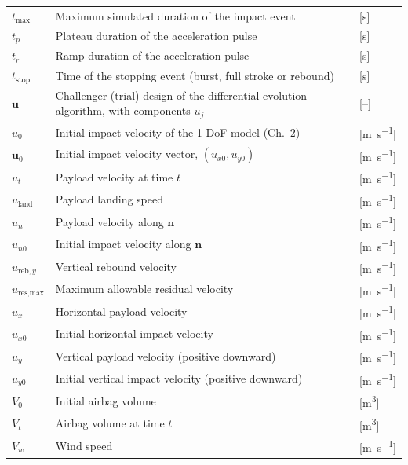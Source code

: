 {\begin{longtable}{L{0.16} L{0.64} L{0.20}}
$t_\text{max}$ & Maximum simulated duration of the impact event & [\si{\second}] \\
$t_p$ & Plateau duration of the acceleration pulse & [\si{\second}] \\
$t_r$ & Ramp duration of the acceleration pulse & [\si{\second}] \\
$t_\text{stop}$ & Time of the stopping event (burst, full stroke or rebound) & [\si{\second}] \\
$\mathbf{u}$ & Challenger (trial) design of the differential evolution algorithm, with components $u_j$ & [--] \\
$u_0$ & Initial impact velocity of the 1-DoF model (Ch.~2) & [\si{\metre\per\second}] \\
$\mathbf{u}_0$ & Initial impact velocity vector, $(u_{x0}, u_{y0})$ & [\si{\metre\per\second}] \\
$u_t$ & Payload velocity at time $t$ & [\si{\metre\per\second}] \\
$u_\text{land}$ & Payload landing speed & [\si{\metre\per\second}] \\
$u_n$ & Payload velocity along $\mathbf{n}$ & [\si{\metre\per\second}] \\
$u_{n0}$ & Initial impact velocity along $\mathbf{n}$ & [\si{\metre\per\second}] \\
$u_{\text{reb},y}$ & Vertical rebound velocity & [\si{\metre\per\second}] \\
$u_\text{res,max}$ & Maximum allowable residual velocity & [\si{\metre\per\second}] \\
$u_x$ & Horizontal payload velocity & [\si{\metre\per\second}] \\
$u_{x0}$ & Initial horizontal impact velocity & [\si{\metre\per\second}] \\
$u_y$ & Vertical payload velocity (positive downward) & [\si{\metre\per\second}] \\
$u_{y0}$ & Initial vertical impact velocity (positive downward) & [\si{\metre\per\second}] \\
$V_0$ & Initial airbag volume & [\si{\metre\cubed}] \\
$V_t$ & Airbag volume at time $t$ & [\si{\metre\cubed}] \\
$V_w$ & Wind speed & [\si{\metre\per\second}] \\

\end{longtable}}
